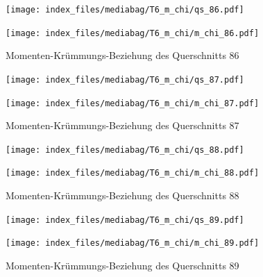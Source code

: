 \documentclass[
  11pt,
  letterpaper,
]{scrreprt}
\begin{document}
\begin{figure}[H]

\begin{minipage}{0.50\linewidth}
\texttt{[image: index\_files/mediabag/T6\_m\_chi/qs\_86.pdf]}\end{minipage}%
%
\begin{minipage}{0.50\linewidth}
\texttt{[image: index\_files/mediabag/T6\_m\_chi/m\_chi\_86.pdf]}\end{minipage}%

\caption{\label{fig-mchi_anhang}Momenten-Krümmungs-Beziehung des
Querschnitts 86}

\end{figure}%

\begin{figure}[H]

\begin{minipage}{0.50\linewidth}
\texttt{[image: index\_files/mediabag/T6\_m\_chi/qs\_87.pdf]}\end{minipage}%
%
\begin{minipage}{0.50\linewidth}
\texttt{[image: index\_files/mediabag/T6\_m\_chi/m\_chi\_87.pdf]}\end{minipage}%

\caption{\label{fig-mchi_anhang}Momenten-Krümmungs-Beziehung des
Querschnitts 87}

\end{figure}%

\begin{figure}[H]

\begin{minipage}{0.50\linewidth}
\texttt{[image: index\_files/mediabag/T6\_m\_chi/qs\_88.pdf]}\end{minipage}%
%
\begin{minipage}{0.50\linewidth}
\texttt{[image: index\_files/mediabag/T6\_m\_chi/m\_chi\_88.pdf]}\end{minipage}%

\caption{\label{fig-mchi_anhang}Momenten-Krümmungs-Beziehung des
Querschnitts 88}

\end{figure}%

\begin{figure}[H]

\begin{minipage}{0.50\linewidth}
\texttt{[image: index\_files/mediabag/T6\_m\_chi/qs\_89.pdf]}\end{minipage}%
%
\begin{minipage}{0.50\linewidth}
\texttt{[image: index\_files/mediabag/T6\_m\_chi/m\_chi\_89.pdf]}\end{minipage}%

\caption{\label{fig-mchi_anhang}Momenten-Krümmungs-Beziehung des
Querschnitts 89}

\end{figure}%
\end{document}
